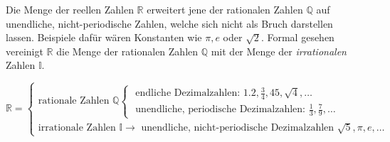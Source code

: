 
Die Menge der reellen Zahlen $\mathbb{R}$ erweitert jene der rationalen Zahlen $\mathbb{Q}$ auf unendliche, nicht-periodische Zahlen, welche sich nicht als Bruch darstellen lassen. Beispiele daf\"{u}r w\"{a}ren Konstanten wie $\pi, e$ oder $\sqrt{2}$. Formal gesehen vereinigt $\mathbb{R}$ die Menge der rationalen Zahlen $\mathbb{Q}$ mit der Menge der \emph{irrationalen} Zahlen $\mathbb{I}$. 

\begin{figure}[h!]
\end{figure}
$$
\mathbb{R} =
\begin{cases}
	\text{rationale Zahlen } \mathbb{Q}
	\begin{cases}
		\text{ endliche Dezimalzahlen: } 1.2, \frac{3}{4}, 45, \sqrt{4}, \ldots
		\\
		\text{ unendliche, periodische Dezimalzahlen: } \frac{1}{3}, \frac{7}{9}, \ldots
	\end{cases}
	\\
	\text{irrationale Zahlen } \mathbb{I} \rightarrow
	\text{ unendliche, nicht-periodische Dezimalzahlen } \sqrt{5}, \pi, e, \ldots
\end{cases}
$$

